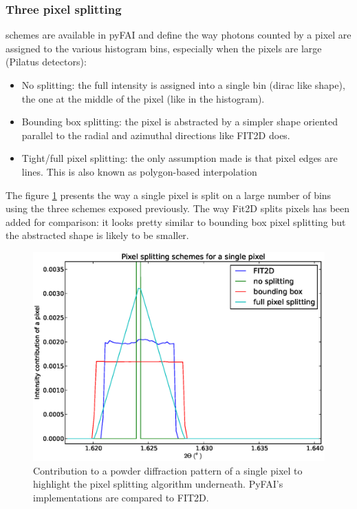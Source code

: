 \documentclass[preprint]{iucr}
\begin{document}
\subsubsection{Three pixel splitting} schemes are available in pyFAI and define
the way photons counted by a pixel are assigned to the various histogram bins,
especially when the pixels are large (Pilatus detectors):
\begin{itemize}
\item No splitting: the full intensity is assigned into a single bin (dirac
like shape), the one at the middle of the pixel (like in the histogram).
\item Bounding box splitting: the pixel is abstracted by a simpler shape
oriented parallel to the radial and azimuthal directions like FIT2D does.
\item
Tight/full pixel splitting: the only assumption made is that pixel
edges are lines. This is also known as polygon-based interpolation
\cite{stefanvdw}
\end{itemize}
The figure \ref{split} presents the way a single pixel is split on a
large number of bins using the three schemes exposed previously. The way Fit2D
splits pixels has been added for comparison: it looks pretty similar to bounding
box pixel splitting but the abstracted shape is likely to be smaller.

\begin{figure}
\label{split}
\begin{center}
\includegraphics[width=15cm]{splitpixel.eps}
\caption{Contribution to a powder diffraction pattern of a single pixel to
highlight the pixel splitting algorithm underneath. PyFAI's implementations are
compared to FIT2D.}
\end{center}
\end{figure}
\end{document}
